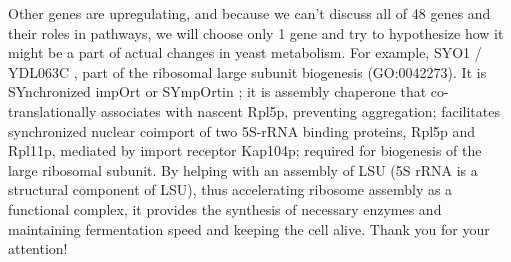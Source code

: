 \documentclass{article}
\begin{document}
 Other genes are upregulating, and because we can't discuss all of 48 genes and their roles in pathways, we will choose only 1 gene and try to hypothesize how it might be a part of actual changes in yeast metabolism. For example, SYO1 / YDL063C \cite{41}, part of the ribosomal large subunit biogenesis (GO:0042273). It is SYnchronized impOrt or SYmpOrtin ; it is assembly chaperone that co-translationally associates with nascent Rpl5p, preventing aggregation; facilitates synchronized nuclear coimport of two 5S-rRNA binding proteins, Rpl5p and Rpl11p, mediated by import receptor Kap104p; required for biogenesis of the large ribosomal subunit. By helping with an assembly of LSU (5S rRNA is a structural component of LSU), thus accelerating ribosome assembly as a functional complex, it provides the synthesis of necessary enzymes and maintaining fermentation speed and keeping the cell alive.
 Thank you for your attention!
 
\end{document}
